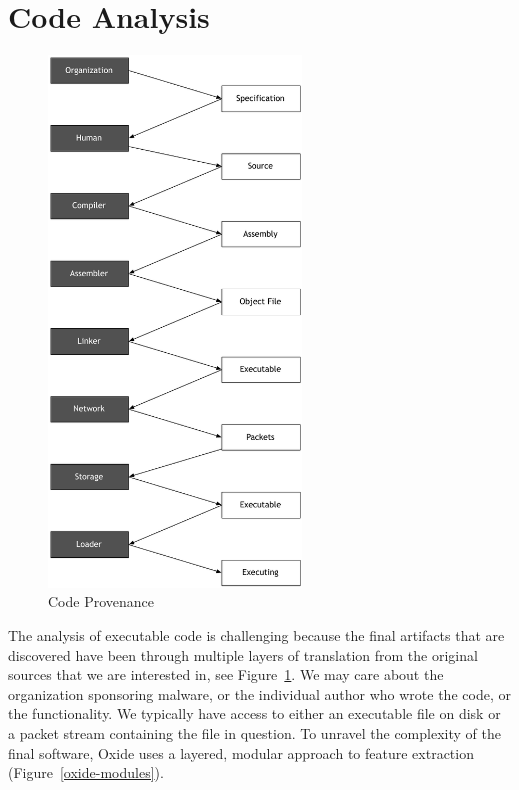 \documentclass{book}
\begin{document}
\section{Code Analysis}
\begin{figure}
\centering
\includegraphics[width=0.6\textwidth]{pdf/provenance.pdf}
\caption{Code Provenance}
\label{provenance}
\end{figure}

The analysis of executable code is challenging because the final artifacts that are discovered have been through multiple layers of translation from the original sources that we are interested in, see Figure~\ref{provenance}.  We may care about the organization sponsoring malware, or the individual author who wrote the code, or the functionality.  We typically have access to either an executable file on disk or a packet stream containing the file in question.  To unravel the complexity of the final software, Oxide uses a layered, modular approach to feature extraction (Figure~\ref{oxide-modules}).
\end{document}
